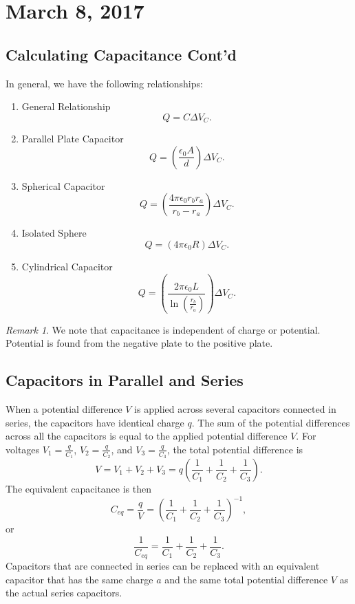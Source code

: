 \documentclass[11pt]{article}
\theoremstyle{plain} %
\theoremstyle{definition}
\theoremstyle{example}
\theoremstyle{remark}
\newtheorem*{remark}{Remark}
\begin{document}
\section{March 8, 2017}
\subsection{Calculating Capacitance Cont'd}
In general, we have the following relationships:
\begin{enumerate}
	\item General Relationship $$Q = C\Delta V_C.$$
	\item Parallel Plate Capacitor $$Q = \left(\frac{\epsilon_0A}{d}\right)\Delta V_C.$$
	\item Spherical Capacitor $$Q = \left(\frac{4\pi\epsilon_0r_br_a}{r_b-r_a}\right)\Delta V_C.$$
	\item Isolated Sphere $$Q = (4\pi\epsilon_0R)\Delta V_C.$$
	\item Cylindrical Capacitor $$Q = \left(\frac{2\pi\epsilon_0L}{\ln\left(\frac{r_b}{r_a}\right)}\right)\Delta V_C.$$
\end{enumerate}

\begin{remark}
We note that capacitance is independent of charge or potential. Potential is found from the negative plate to the positive plate. 
\end{remark}

\subsection{Capacitors in Parallel and Series}

When a potential difference $V$ is applied across several capacitors connected in series, the capacitors have identical charge $q$. The sum of the potential differences across all the capacitors is equal to the applied potential difference $V$. For voltages
$V_1 = \frac{q}{C_1}$, $V_2 = \frac{q}{C_2}$, and $V_3 = \frac{q}{C_3}$,
the total potential difference is 
$$V = V_1 + V_2 + V_3 = q\left(\frac{1}{C_1} + \frac{1}{C_2} + \frac{1}{C_3}\right).
$$ The equivalent capacitance is then $$C_{eq} = \frac{q}{V} = \left(\frac{1}{C_1} + \frac{1}{C_2} + \frac{1}{C_3}\right)^{-1},$$
or 
$$\frac{1}{C_{eq}} = \frac{1}{C_1} + \frac{1}{C_2} + \frac{1}{C_3}.$$
Capacitors that are connected in series can be replaced with an equivalent capacitor that has the same charge $a$ and the same total potential difference $V$ as the actual series capacitors. 
\end{document}
